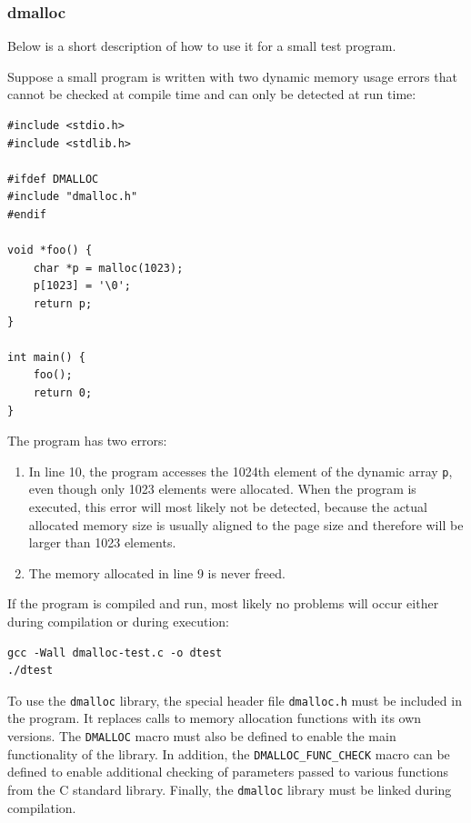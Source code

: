 \subsubsection*{dmalloc}

Below is a short description of how to use it for a small test program.

Suppose a small program is written with two dynamic memory usage errors that cannot be checked at
compile time and can only be detected at run time:

\begin{verbatim}
#include <stdio.h>
#include <stdlib.h>

#ifdef DMALLOC
#include "dmalloc.h"
#endif

void *foo() {
    char *p = malloc(1023);
    p[1023] = '\0';
    return p;
}

int main() {
    foo();
    return 0;
}
\end{verbatim}

The program has two errors:

\begin{enumerate}
    \item In line 10, the program accesses the 1024th element of the dynamic array \texttt{p}, even
    though only 1023 elements were allocated. When the program is executed, this error will most
    likely not be detected, because the actual allocated memory size is usually aligned to the page
    size and therefore will be larger than 1023 elements.
    \item The memory allocated in line 9 is never freed.
\end{enumerate}

If the program is compiled and run, most likely no problems will occur either during compilation
or during execution:

\begin{verbatim}
gcc -Wall dmalloc-test.c -o dtest
./dtest
\end{verbatim}

To use the \texttt{dmalloc} library, the special header file \texttt{dmalloc.h} must be included in
the program. It replaces calls to memory allocation functions with its own versions. The
\texttt{DMALLOC} macro must also be defined to enable the main functionality of the library. In
addition, the \texttt{DMALLOC\_FUNC\_CHECK} macro can be defined to enable additional checking of
parameters passed to various functions from the C standard library. Finally, the \texttt{dmalloc}
library must be linked during compilation.

